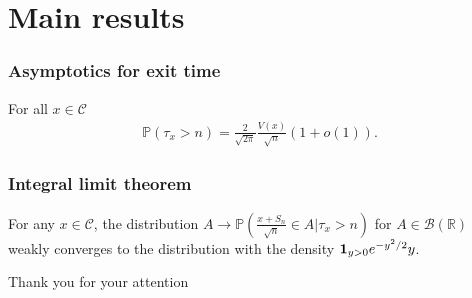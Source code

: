 \documentclass[serif,professionalfont,tree,usepdftitle=false, slidestop]{beamer}
\numberwithin{equation}{section}
\begin{document}
\section{Main results}
\begin{frame}
\frametitle{Asymptotics for exit time} 
\begin{thm1}\label{asym} For all $x\in \mathcal C$
\begin{eqnarray}
\mathbb P\left(\tau_x> n\right) =  \frac{2}{\sqrt {2\pi}} \frac{V(x)}{\sqrt n}(1 + o(1)).\nonumber
\end{eqnarray}
\end{thm1}
\end{frame}
\begin{frame}
\frametitle{Integral limit theorem} 
\begin{thm1}\label{dwlm22}
For any $x\in \mathcal C$, the distribution  $A\to \mathbb P\left(\frac{x+S_n}{\sqrt n}\in A\big|\tau_x>n\right)$ for $A\in \mathcal B(\mathbb R)$ weakly converges  to the distribution with the density $\textbf 1_{y>0}e^{-y^2/2}y$.
\end{thm1}
\end{frame}
\begin{frame}
\vspace{76pt}
\begin{center}
Thank you for your attention
\end{center}

\end{frame}
\end{document}
